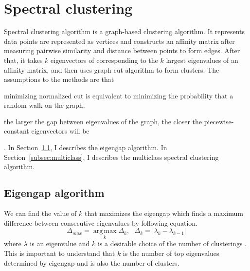 \section{Spectral clustering}
\label{sec:spectralclustering}
Spectral clustering algorithm is a graph-based clustering algorithm. 
It represents data points are represented as vertices and constructs an affinity matrix after measuring pairwise similarity and distance between points to form edges. 
After that, it takes $k$ eigenvectors of corresponding to the $k$ largest eigenvalues of an affinity matrix, and then uses graph cut algorithm to form clusters. 
The assumptions to the methods are that \begin{inparaenum}[\itshape a\upshape)]
\item minimizing normalized cut is equivalent to minimizing the probability that a random walk on the graph.
\item the larger the gap between eigenvalues of the graph, %
the closer the piecewise-constant eigenvectors will be
\end{inparaenum}. \newline 
In Section~\ref{subsec:eigengap}, I describes the eigengap algorithm.\newline
In Section~\ref{subsec:multiclass}, I describes the multiclass spectral clustering algorithm.


\subsection{Eigengap algorithm}
\label{subsec:eigengap}
We can find the value of $k$ that maximizes the eigengap which finds a maximum difference between consecutive eigenvalues by following equation. 
\begin{equation}
\Delta_{max} = \operatorname*{arg\,max}_{k} \Delta_k, \text{~~} \Delta_k = | \lambda_k - \lambda_{k-1} |
\end{equation}
where $\lambda$ is an eigenvalue and $k$ is a desirable choice of the number of clusterings \cite{ulrike07}.
This is important to understand that $k$ is the number of top eigenvalues determined by eigengap and is also the number of clusters. 

